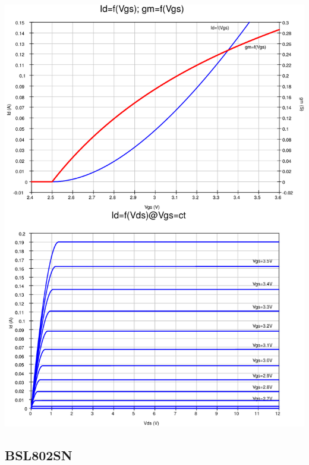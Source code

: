 \documentclass{../template/tp}
\begin{document}
\begin{center}
{\includegraphics[width=16cm]{courbes_mos_2k16-crop.pdf}\vspace*{-5cm}}%
\end{center}
%
\subsection{BSL802SN}
\end{document}
